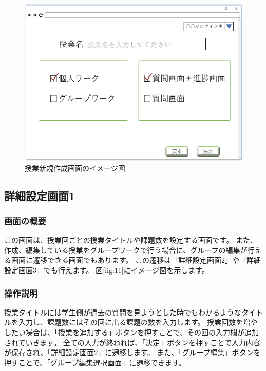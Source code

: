 \begin{figure}[htbp]
  \begin{center}
    \includegraphics[width=1\linewidth,clip]{./img/10.png}
    \caption{授業新規作成画面のイメージ図}\label{fig:10}
  \end{center}
\end{figure}

\newpage

\subsection{詳細設定画面1}
\subsubsection{画面の概要}
この画面は、授業回ごとの授業タイトルや課題数を設定する画面です。
また、作成、編集している授業をグループワークで行う場合に、グループの編集が行える画面に遷移できる画面でもあります。
この遷移は「詳細設定画面2」や「詳細設定画面3」でも行えます。
図\ref{fig:11}にイメージ図を示します。

\subsubsection{操作説明}
授業タイトルには学生側が過去の質問を見ようとした時でもわかるようなタイトルを入力し、課題数にはその回に出る課題の数を入力します。
授業回数を増やしたい場合は、「授業を追加する」ボタンを押すことで、その回の入力欄が追加されていきます。
全ての入力が終われば、「決定」ボタンを押すことで入力内容が保存され、「詳細設定画面2」に遷移します。
また、「グループ編集」ボタンを押すことで、「グループ編集選択画面」に遷移できます。

